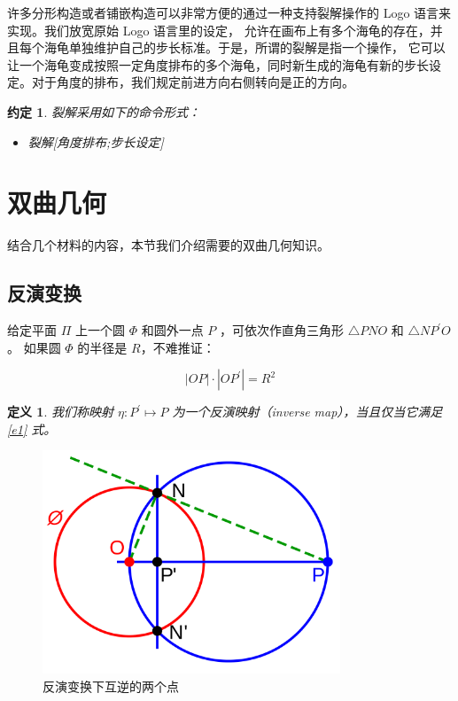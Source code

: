 \documentclass[a4paper,12pt]{article}
\newtheorem{definition}{定义}
\newtheorem{convention}{约定}
\begin{document}
许多分形构造或者铺嵌构造可以非常方便的通过一种支持裂解操作的 Logo 语言来实现。我们放宽原始 Logo 语言里的设定，
允许在画布上有多个海龟的存在，并且每个海龟单独维护自己的步长标准。于是，所谓的裂解是指一个操作，
它可以让一个海龟变成按照一定角度排布的多个海龟，同时新生成的海龟有新的步长设定。对于角度的排布，我们规定前进方向右侧转向是正的方向。

\begin{convention}
裂解采用如下的命令形式：
\begin{itemize}
\item 裂解[角度排布;步长设定]
\end{itemize}
\end{convention}

\newpage

\section{双曲几何}

结合几个材料的内容，本节我们介绍需要的双曲几何知识。

\subsection{反演变换}

给定平面 $\Pi$ 上一个圆 $\Phi$ 和圆外一点 $P$ ，可依次作直角三角形 $\bigtriangleup P N O$ 和 $\bigtriangleup N P^\prime O$ 。
如果圆 $\Phi$ 的半径是 $R$，不难推证：

\begin{equation} \label{e1}
|OP| \cdot |OP^\prime| = R^2
\end{equation}

\begin{definition}
\label{d1}
我们称映射 $\eta: P^\prime \mapsto P$ 为一个反演映射（inverse map），当且仅当它满足 \ref{e1} 式。
\end{definition}

\begin{figure}[ht]
\centering
\includegraphics[width=3.5in]{images/inversion_in_circle.png}
\caption{反演变换下互逆的两个点}
\end{figure}
\end{document}
